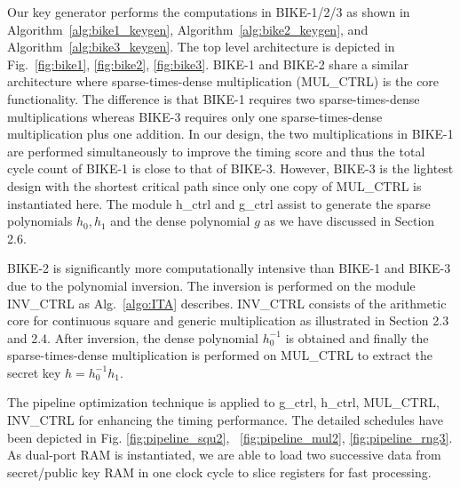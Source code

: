 \documentclass[runningheads]{llncs}
\begin{document}
Our key generator performs the computations in BIKE-1/2/3 as shown in Algorithm~\ref{alg:bike1_keygen}, Algorithm~\ref{alg:bike2_keygen}, and Algorithm~\ref{alg:bike3_keygen}. The top level architecture is depicted in Fig.~\ref{fig:bike1}, \ref{fig:bike2}, \ref{fig:bike3}. BIKE-1 and BIKE-2 share a similar architecture where sparse-times-dense multiplication (MUL\_CTRL) is the core functionality. The difference is that BIKE-1 requires two sparse-times-dense multiplications whereas BIKE-3 requires only one sparse-times-dense multiplication plus one addition. In our design, the two multiplications in BIKE-1 are performed simultaneously to improve the timing score and thus the total cycle count of BIKE-1 is close to that of BIKE-3. However, BIKE-3 is the lightest design with the shortest critical path since only one copy of MUL\_CTRL is instantiated here. The module h\_ctrl and g\_ctrl assist to generate the sparse polynomials $h_0,h_1$ and the dense polynomial $g$ as we have discussed in Section 2.6.

BIKE-2 is significantly more computationally intensive than BIKE-1 and BIKE-3 due to the polynomial inversion. The inversion is performed on the module INV\_CTRL as Alg.~\ref{algo:ITA} describes. INV\_CTRL consists of the arithmetic core for continuous square and generic multiplication as illustrated in Section 2.3 and 2.4. After inversion, the dense polynomial $h_0^{-1}$ is obtained and finally the sparse-times-dense multiplication is performed on MUL\_CTRL to extract the secret key $h=h_0^{-1}h_1$.

 The pipeline optimization technique is applied to g\_ctrl, h\_ctrl, MUL\_CTRL, INV\_CTRL for enhancing the timing performance. The detailed schedules have been depicted in Fig. \ref{fig:pipeline_squ2}, ~\ref{fig:pipeline_mul2}, \ref{fig:pipeline_rng3}. As dual-port RAM is instantiated, we are able to load two successive data from secret/public key RAM in one clock cycle to slice registers for fast processing.
\end{document}
